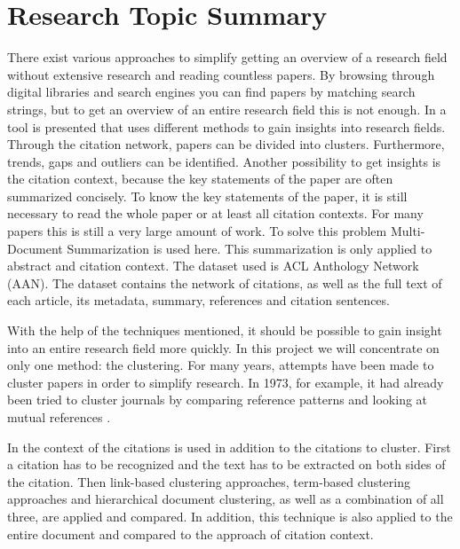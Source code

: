 \section{Research Topic Summary}
There exist various approaches to simplify getting an overview of a research field without extensive research and reading countless papers. By browsing through digital libraries and search engines you can find papers by matching search strings, but to get an overview of an entire research field this is not enough.
In \cite{Rapid_understanding_of_scientific_paper_collections} a tool is presented that uses different methods to gain insights into research fields.
Through the citation network, papers can be divided into clusters. Furthermore, trends, gaps and outliers can be identified.
Another possibility to get insights is the citation context, because the key statements of the paper are often summarized concisely. To know the key statements of the paper, it is still necessary to read the whole paper or at least all citation contexts. For many papers this is still a very large amount of work. To solve this problem Multi-Document Summarization is used here. This summarization is only applied to abstract and citation context. The dataset used is ACL Anthology Network (AAN).\cite{aan} The dataset contains the network of citations, as well as the full text of each article, its metadata, summary, references and citation sentences. 

With the help of the techniques mentioned, it should be possible to gain insight into an entire research field more quickly.
In this project we will concentrate on only one method: the clustering.
For many years, attempts have been made to cluster papers in order to simplify research. In 1973, for example, it had already been tried to cluster journals by comparing reference patterns and looking at mutual references \cite{Clustering_of_scientific_journals}.

In \cite{Document_clustering_of_scientific_texts_using_citation_contexts} the context of the citations is used in addition to the citations to cluster.
First a citation has to be recognized and the text has to be extracted on both sides of the citation. Then link-based clustering approaches, term-based clustering approaches and hierarchical document clustering, as well as a combination of all three, are applied and compared. In addition, this technique is also applied to the entire document and compared to the approach of citation context.

